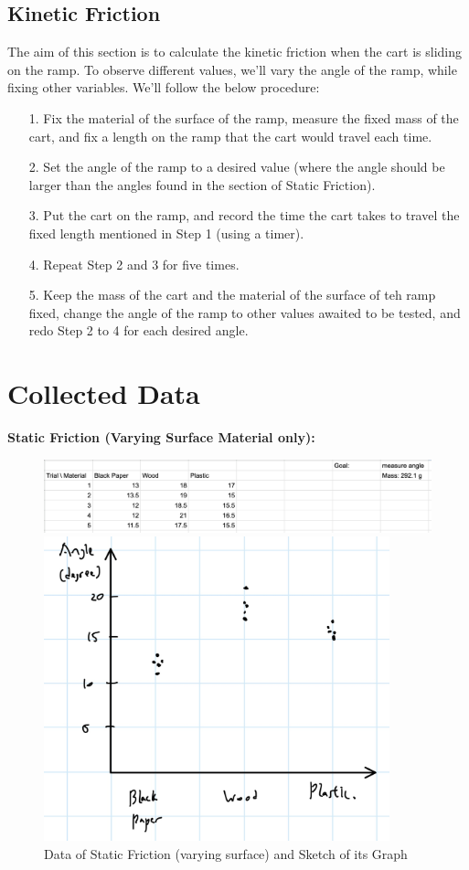 \documentclass{article}
\begin{document}
\subsection{Kinetic Friction}
The aim of this section is to calculate the kinetic friction when the cart is sliding on the ramp. To observe different values, we'll vary the angle of the ramp, while fixing other variables. We'll follow the below procedure:
\begin{itemize}
    \item[1.] Fix the material of the surface of the ramp, measure the fixed mass of the cart, and fix a length on the ramp that the cart would travel each time.
    \item[2.] Set the angle of the ramp to a desired value (where the angle should be larger than the angles found in the section of Static Friction).
    \item[3.] Put the cart on the ramp, and record the time the cart takes to travel the fixed length mentioned in Step 1 (using a timer).
    \item[4.] Repeat Step 2 and 3 for five times.
    \item[5.] Keep the mass of the cart and the material of the surface of teh ramp fixed, change the angle of the ramp to other values awaited to be tested, and redo Step 2 to 4 for each desired angle. 
\end{itemize}

\pagebreak

\section{Collected Data}
\textbf{Static Friction (Varying Surface Material only):}
\begin{figure}[h!]
    \centering
    \includegraphics[width=150mm]{static_surface_data.png}

    \hfil

    \includegraphics[width=100mm]{static_surface.jpg}
    \caption{Data of Static Friction (varying surface) and Sketch of its Graph}
\end{figure}
\end{document}
